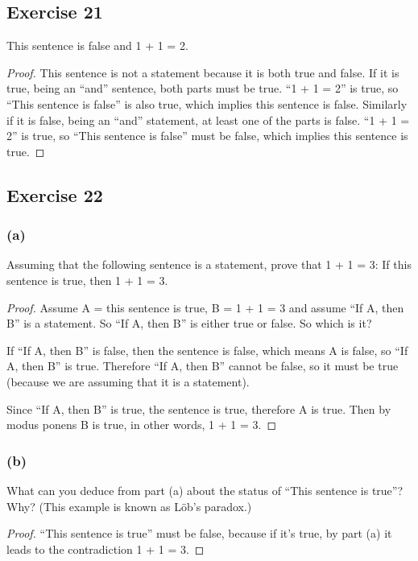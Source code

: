 \documentclass[14pt]{extarticle}
\begin{document}
\subsection{Exercise 21}
This sentence is false and 1 + 1 = 2.

\begin{proof}
  This sentence is not a statement because it is both true and false. If it is true, being an ``and'' sentence, both
  parts must be true. ``1 + 1 = 2'' is true, so ``This sentence is false'' is also true, which implies this
  sentence is false. Similarly if it is false, being an ``and'' statement, at least one of the parts is false.
  ``1 + 1 = 2'' is true, so ``This sentence is false'' must be false, which implies this sentence is true.
\end{proof}

\subsection{Exercise 22}

\subsubsection{(a)}
Assuming that the following sentence is a statement, prove that 1 + 1 = 3: If this sentence is true, then 1 + 1 = 3.

\begin{proof}
  Assume A = this sentence is true, B = 1 + 1 = 3 and assume ``If A, then B'' is a statement. So ``If A, then B'' is
  either true or false. So which is it?

  If ``If A, then B'' is false, then the sentence is false, which means A is false, so ``If A, then B'' is true.
  Therefore ``If A, then B'' cannot be false, so it must be true (because we are assuming that it is a statement).

  Since ``If A, then B'' is true, the sentence is true, therefore A is true. Then by modus ponens B is true, in
  other words, 1 + 1 = 3.
\end{proof}

\subsubsection{(b)}
What can you deduce from part (a) about the status of “This sentence is true”? Why?
(This example is known as Löb’s paradox.)

\begin{proof}
  ``This sentence is true'' must be false, because if it's true, by part (a) it leads to the contradiction 1 + 1 = 3.
\end{proof}
\end{document}

